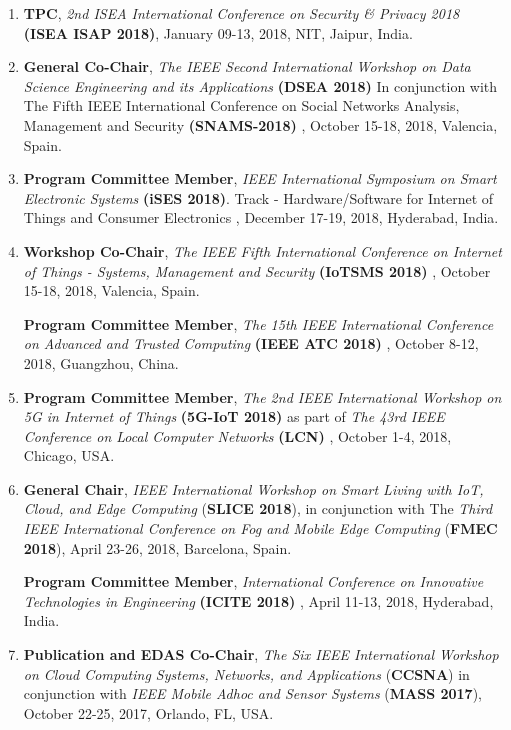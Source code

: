 
\begin{enumerate} [label=(\arabic*).]


\item
\textbf{TPC}, \textit{2nd ISEA International Conference on Security \& Privacy 2018} \textbf{(ISEA ISAP 2018)}, January 09-13, 2018, NIT, Jaipur, India.

\item
\textbf{General Co-Chair}, \textit{The IEEE Second International Workshop on Data Science Engineering and its Applications} \textbf{(DSEA 2018)} In conjunction with 
The Fifth IEEE International Conference on Social Networks Analysis, Management and Security \textbf{(SNAMS-2018) }, October 15-18, 2018, Valencia, Spain.

\item
\textbf{Program Committee Member}, \textit{IEEE International Symposium on Smart Electronic Systems} \textbf{(iSES 2018)}. Track - Hardware/Software for Internet of Things and Consumer Electronics , December 17-19, 2018, Hyderabad, India.

\item
\textbf{Workshop Co-Chair}, \textit{The IEEE Fifth International Conference on Internet of Things - Systems, Management and Security} \textbf{(IoTSMS 2018)} , October 15-18, 2018, Valencia, Spain.

\textbf{Program Committee Member}, \textit{The 15th IEEE International Conference on Advanced and Trusted Computing} \textbf{(IEEE ATC 2018)} , October 8-12, 2018, Guangzhou, China. %

\item
\textbf{Program Committee Member}, \textit{The 2nd IEEE International Workshop on 5G in Internet of Things} \textbf{(5G-IoT 2018)} as part of \textit{The 43rd IEEE Conference on Local Computer Networks} \textbf{(LCN)} , October 1-4, 2018, Chicago, USA. %

\item
\textbf{General Chair}, \textit{IEEE International Workshop on Smart Living with IoT, Cloud, and Edge Computing }(\textbf{SLICE 2018}), in conjunction with The \textit{Third IEEE International Conference on Fog and Mobile Edge Computing} (\textbf{FMEC 2018}), April 23-26, 2018, Barcelona, Spain.

\textbf{Program Committee Member}, \textit{International Conference on Innovative Technologies in Engineering} \textbf{(ICITE 2018) }, April 11-13, 2018, Hyderabad, India.

\item
\textbf{Publication and EDAS Co-Chair}, \textit{The Six IEEE International Workshop on Cloud Computing Systems, Networks, and Applications }(\textbf{CCSNA}) in conjunction with \textit{IEEE Mobile Adhoc and Sensor Systems} (\textbf{MASS 2017}), October 22-25, 2017, Orlando, FL, USA. %


\end{enumerate}
